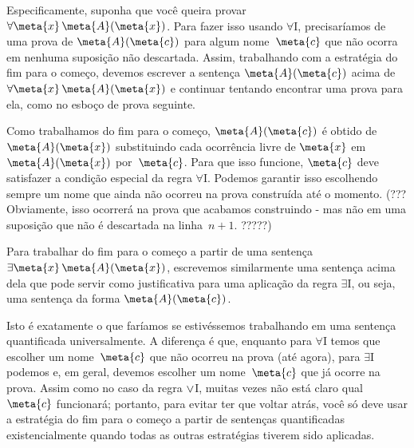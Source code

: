 Especificamente, suponha que voc\^e queira provar $\forall \meta{x}\, \atom{\meta{A}}{\meta{x}}$. Para fazer isso usando $\forall$I, precisar\'iamos de uma prova de $\atom{\meta{A}}{\meta{c}}$ para algum nome~$\meta{c}$ que n\~ao ocorra em nenhuma suposi\c c\~ao n\~ao descartada. Assim, trabalhando com a estrat\'egia do fim para o come\c co, devemos escrever  a senten\c ca $\atom{\meta{A}}{\meta{c}}$ acima de $\forall \meta{x}\, \atom{\meta{A}}{\meta{x}}$ e continuar tentando encontrar uma prova para ela, como no esbo\c co de prova seguinte. 
 
\begin{fitchproof}
	\ellipsesline
\end{fitchproof}
 
Como trabalhamos do fim para o come\c co,  $\atom{\meta{A}}{\meta{c}}$ \'e obtido de $\atom{\meta{A}}{\meta{x}}$ substituindo cada ocorr\^encia livre de $\meta{x}$ em $\atom{\meta{A}}{\meta{x}}$ por~$\meta{c}$. Para que isso funcione, $\meta{c}$ deve satisfazer a condi\c c\~ao especial da regra $\forall$I. Podemos garantir isso escolhendo sempre um nome que ainda n\~ao ocorreu na prova constru\'ida at\'e o momento. (??? Obviamente, isso ocorrer\'a na prova que acabamos construindo - mas n\~ao em uma suposi\c c\~ao que n\~ao \'e descartada na linha~$n + 1$.  ?????)

Para trabalhar do fim para o come\c co  a partir de uma senten\c ca $\exists \meta{x}\, \atom{\meta{A}}{\meta{x}}$, escrevemos similarmente uma senten\c ca acima dela que pode servir como justificativa para uma aplica\c c\~ao da regra $\exists$I, ou seja, uma senten\c ca da forma $\atom{\meta{A}}{\meta{c}}$. 
\begin{fitchproof}
	\ellipsesline
\end{fitchproof}
Isto \'e exatamente o que far\'iamos se estiv\'essemos trabalhando em uma senten\c ca quantificada universalmente. A diferen\c ca \'e que, enquanto para $\forall$I temos que escolher um nome~$\meta{c}$ que n\~ao ocorreu na prova (at\'e agora), para $\exists$I podemos e, em geral, devemos escolher um nome~$\meta{c}$ que j\'a ocorre na prova. Assim como no caso da regra $\vee$I, muitas vezes n\~ao est\'a claro qual $\meta{c}$ funcionar\'a; portanto, para evitar ter que voltar atr\'as, voc\^e s\'o deve usar a estrat\'egia do fim para o come\c co a partir de senten\c cas quantificadas existencialmente quando todas as outras estrat\'egias tiverem sido aplicadas.

